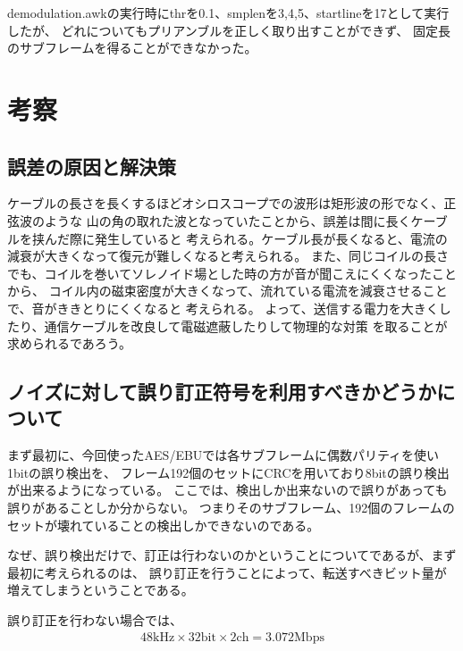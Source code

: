 \documentclass[11pt,a4j]{jsarticle}
\begin{document}
demodulation.awkの実行時にthrを0.1、smplenを3,4,5、startlineを17として実行したが、
どれについてもプリアンブルを正しく取り出すことができず、
固定長のサブフレームを得ることができなかった。








\section{考察}
\label{sec:考察}


\subsection{誤差の原因と解決策}
\label{sub:誤差の原因と解決策}

ケーブルの長さを長くするほどオシロスコープでの波形は矩形波の形でなく、正弦波のような
山の角の取れた波となっていたことから、誤差は間に長くケーブルを挟んだ際に発生していると
考えられる。ケーブル長が長くなると、電流の減衰が大きくなって復元が難しくなると考えられる。
また、同じコイルの長さでも、コイルを巻いてソレノイド場とした時の方が音が聞こえにくくなったことから、
コイル内の磁束密度が大きくなって、流れている電流を減衰させることで、音がききとりにくくなると
考えられる。
よって、送信する電力を大きくしたり、通信ケーブルを改良して電磁遮蔽したりして物理的な対策
を取ることが求められるであろう。


\subsection{ノイズに対して誤り訂正符号を利用すべきかどうかについて}
\label{sub:ノイズに対して誤り訂正符号を利用すべきかどうかについて}

まず最初に、今回使ったAES/EBUでは各サブフレームに偶数パリティを使い1bitの誤り検出を、
フレーム192個のセットにCRCを用いており8bitの誤り検出が出来るようになっている。
ここでは、検出しか出来ないので誤りがあっても誤りがあることしか分からない。
つまりそのサブフレーム、192個のフレームのセットが壊れていることの検出しかできないのである。

なぜ、誤り検出だけで、訂正は行わないのかということについてであるが、まず最初に考えられるのは、
誤り訂正を行うことによって、転送すべきビット量が増えてしまうということである。

誤り訂正を行わない場合では、
\begin{align*}
	48 \mathrm{kHz} \times 32 \mathrm{bit} \times 2 \mathrm{ch} = 3.072 \mathrm{Mbps}
\end{align*}
\end{document}

